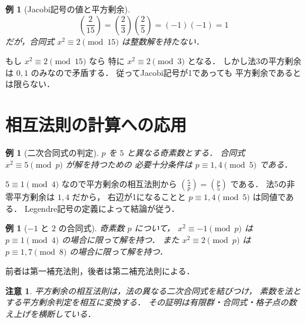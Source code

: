 \documentclass[a5paper,10pt,onecolumn]{jsarticle}
\makeatletter
\theoremstyle{mathnotetheorem}
\newtheorem{example}[theorem]{例}
\newtheorem{remark}[theorem]{注意}
\renewcommand{\proofname}{証明}
\renewenvironment{proof}[1][\proofname]{%
  \par\pushQED{\qed}\normalfont\topsep4\p@\@plus2\p@\relax
  \trivlist\item[\hskip\labelsep\bfseries #1]\ignorespaces
}{\popQED\endtrivlist\@endpefalse}
\makeatother
\begin{document}
\begin{example}[Jacobi記号の値と平方剰余]
\[
 \left(\frac2{15}\right)
 =\left(\frac23\right)\left(\frac25\right)
 =(-1)(-1)=1
\]
だが，合同式 $x^2\equiv2\pmod{15}$ は整数解を持たない．
\end{example}
\begin{proof}
もし $x^2\equiv2\pmod{15}$ なら
特に $x^2\equiv2\pmod3$ となる．
しかし法3の平方剰余は $0,1$ のみなので矛盾する．
従ってJacobi記号が1であっても
平方剰余であるとは限らない．
\end{proof}

\section{相互法則の計算への応用}

\begin{example}[二次合同式の判定]
$p$ を $5$ と異なる奇素数とする．
合同式 $x^2\equiv5\pmod p$ が解を持つための
必要十分条件は
$p\equiv1,4\pmod5$ である．
\end{example}
\begin{proof}
$5\equiv1\pmod4$ なので平方剰余の相互法則から
$\left(\frac5p\right)=\left(\frac p5\right)$ である．
法5の非零平方剰余は $1,4$ だから，
右辺が1になることと $p\equiv1,4\pmod5$ は同値である．
Legendre記号の定義によって結論が従う．
\end{proof}

\begin{example}[$-1$ と $2$ の合同式]
奇素数 $p$ について，
$x^2\equiv-1\pmod p$ は
$p\equiv1\pmod4$ の場合に限って解を持つ．
また $x^2\equiv2\pmod p$ は
$p\equiv1,7\pmod8$ の場合に限って解を持つ．
\end{example}
\begin{proof}
前者は第一補充法則，後者は第二補充法則による．
\end{proof}

\begin{remark}
平方剰余の相互法則は，法の異なる二次合同式を結びつけ，
素数を法とする平方剰余判定を相互に変換する．
その証明は有限群・合同式・格子点の数え上げを横断している．
\end{remark}
\end{document}
